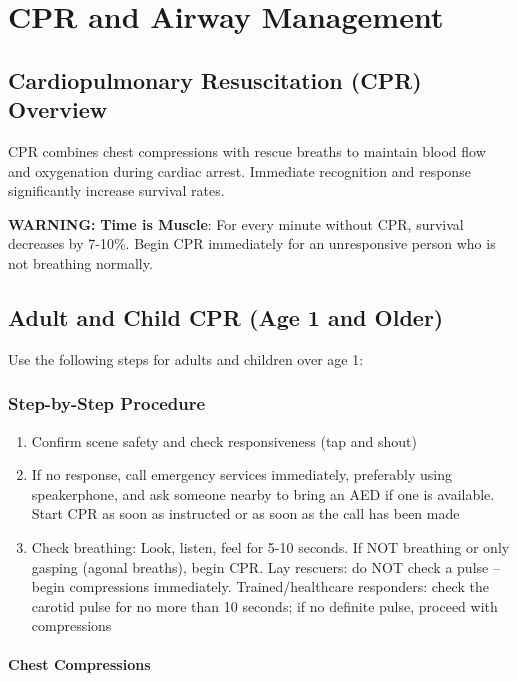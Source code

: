 \chapter{CPR and Airway Management}\label{ch:cpr}

\section{Cardiopulmonary Resuscitation (CPR) Overview}

CPR combines chest compressions with rescue breaths to maintain blood flow and oxygenation during cardiac arrest. Immediate recognition and response significantly increase survival rates.

\textbf{WARNING:} \textbf{Time is Muscle}: For every minute without CPR, survival decreases by 7-10\%. Begin CPR immediately for an unresponsive person who is not breathing normally.

\section{Adult and Child CPR (Age 1 and Older)}

Use the following steps for adults and children over age 1:

\subsection{Step-by-Step Procedure}

\begin{enumerate}[leftmargin=*]
\item Confirm scene safety and check responsiveness (tap and shout)
\item If no response, call emergency services immediately, preferably using speakerphone, and ask someone nearby to bring an AED if one is available. Start CPR as soon as instructed or as soon as the call has been made
\item Check breathing: Look, listen, feel for 5-10 seconds. If NOT breathing or only gasping (agonal breaths), begin CPR. Lay rescuers: do NOT check a pulse -- begin compressions immediately. Trained/healthcare responders: check the carotid pulse for no more than 10 seconds; if no definite pulse, proceed with compressions \cite{ilcor_2025}
\end{enumerate}
\subsubsection{Chest Compressions}

